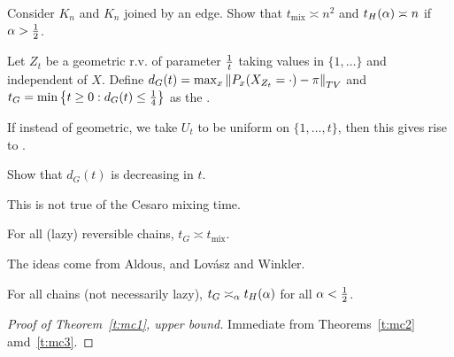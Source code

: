 \begin{exr}
Consider $K_n$ and $K_n$ joined by an edge.
Show that $t_{\text{mix}}\asymp n^2$ and $t_H(\alpha)\asymp n$ if $\alpha>\frac{1}{2}$.
\end{exr}
\begin{df}
Let $Z_t$ be a geometric r.v. of parameter $\frac{1}{t}$ taking values in $\{1,\ldots\}$ and independent of $X$. 
Define $d_G(t)=\max_x\left\Vert {P_x(X_{Z_t}=\cdot) - \pi}\right\Vert_{TV}$ and $t_G=\min\left\{{t\ge 0}:{d_G(t)\le \frac{1}{4}}\right\}$ as the .
\end{df}
\begin{rem}
If instead of geometric, we take $U_t$ to be uniform on $\{1,\ldots,t\}$, then this gives rise to .
\end{rem}
\begin{exr}
Show that $d_G(t)$ is decreasing in $t$.
\end{exr}
This is not true of the Cesaro mixing time.
\begin{thm}\label{t:mc2}
For all (lazy) reversible chains, $t_G\asymp t_{\text{mix}}$.
\end{thm}
The ideas come from Aldous, and Lov\'asz and Winkler.
\begin{thm}\label{t:mc3}
For all chains (not necessarily lazy), $t_G\asymp_\alpha t_H(\alpha)$ for all $\alpha<\frac{1}{2}$.
\end{thm}
\begin{proof}[Proof of Theorem~\ref{t:mc1}, upper bound]
Immediate from Theorems~\ref{t:mc2} amd~\ref{t:mc3}.
\end{proof}
